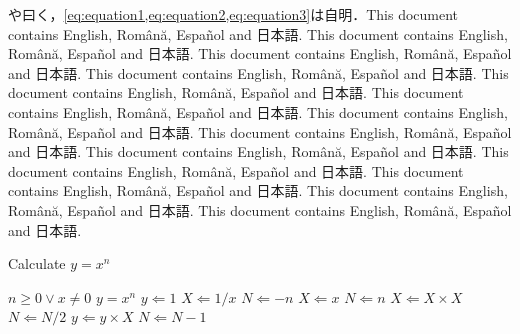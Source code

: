 \documentclass[
	10pt,
	a4j,		%
	twocolumn,	%
	uplatex
]{jsarticle}
\renewcommand{\ref}{\cref}
\begin{document}
\citet{110001167075}や\citet{mr1763essay}曰く，\ref{eq:equation1,eq:equation2,eq:equation3}は自明．This document contains English, Română, Español and 日本語. This document contains English, Română, Español and 日本語. This document contains English, Română, Español and 日本語. This document contains English, Română, Español and 日本語. This document contains English, Română, Español and 日本語. This document contains English, Română, Español and 日本語. This document contains English, Română, Español and 日本語. This document contains English, Română, Español and 日本語. This document contains English, Română, Español and 日本語. This document contains English, Română, Español and 日本語. This document contains English, Română, Español and 日本語. This document contains English, Română, Español and 日本語. This document contains English, Română, Español and 日本語.

\begin{algorithm}[t]
	\caption{Calculate $y = x^n$}
	\label{alg:algorithm}
	\begin{algorithmic}[1]
		\Require	$n \geq 0 \vee x \neq 0$
		\Ensure	$y = x^n$
		\State $y \Leftarrow 1$
				\State $X \Leftarrow 1 / x$
				\State $N \Leftarrow -n$
			\Else
				\State $X \Leftarrow x$
				\State $N \Leftarrow n$
			\EndIf
				\State $X \Leftarrow X \times X$
				\State $N \Leftarrow N / 2$
			\Else[$N$ is odd]
				\State $y \Leftarrow y \times X$
				\State $N \Leftarrow N - 1$
			\EndIf
		\EndWhile
	\end{algorithmic}
\end{algorithm}

{\footnotesize
	
	

	\makeatletter
	\renewcommand{\@biblabel}[1]{#1)}
	\makeatother

}
\end{document}
